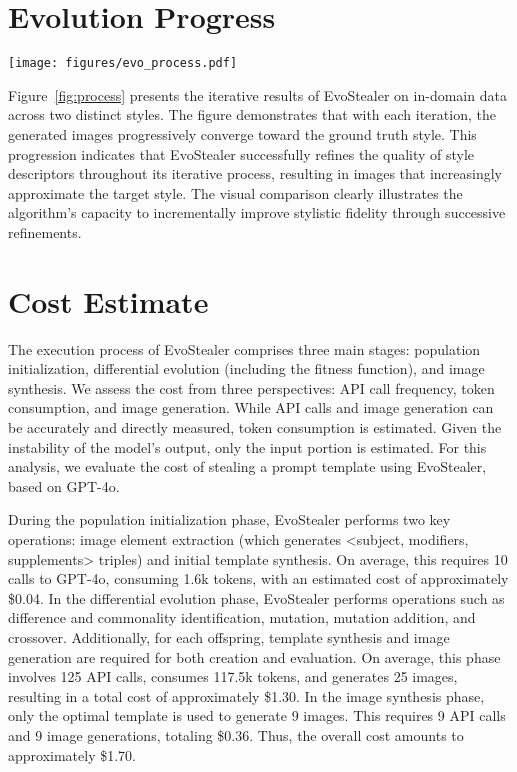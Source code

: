 \section{Evolution Progress} \label{app_progress}
\begin{figure*}[h!]
    \centering
    \texttt{[image: figures/evo\_process.pdf]}
    \caption{Results of each evolutionary cycle.}
    \label{fig:process}
\end{figure*}

Figure~\ref{fig:process} presents the iterative results of EvoStealer on in-domain data across two distinct styles. The figure demonstrates that with each iteration, the generated images progressively converge toward the ground truth style. This progression indicates that EvoStealer successfully refines the quality of style descriptors throughout its iterative process, resulting in images that increasingly approximate the target style. The visual comparison clearly illustrates the algorithm's capacity to incrementally improve stylistic fidelity through successive refinements.

\section{Cost Estimate} \label{app_cost}
The execution process of EvoStealer comprises three main stages: population initialization, differential evolution (including the fitness function), and image synthesis. We assess the cost from three perspectives: API call frequency, token consumption, and image generation. While API calls and image generation can be accurately and directly measured, token consumption is estimated. Given the instability of the model's output, only the input portion is estimated. For this analysis, we evaluate the cost of stealing a prompt template using EvoStealer, based on GPT-4o.

During the population initialization phase, EvoStealer performs two key operations: image element extraction (which generates <subject, modifiers, supplements> triples) and initial template synthesis. On average, this requires 10 calls to GPT-4o, consuming 1.6k tokens, with an estimated cost of approximately \$0.04. In the differential evolution phase, EvoStealer performs operations such as difference and commonality identification, mutation, mutation addition, and crossover. Additionally, for each offspring, template synthesis and image generation are required for both creation and evaluation. On average, this phase involves 125 API calls, consumes 117.5k tokens, and generates 25 images, resulting in a total cost of approximately \$1.30. In the image synthesis phase, only the optimal template is used to generate 9 images. This requires 9 API calls and 9 image generations, totaling \$0.36. Thus, the overall cost amounts to approximately \$1.70.


